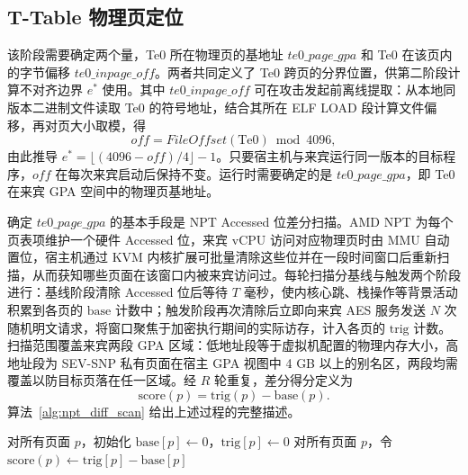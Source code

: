 \subsection{T-Table 物理页定位}
\label{sec:phase1}

该阶段需要确定两个量，Te0 所在物理页的基地址 $\mathit{te0\_page\_gpa}$ 和 Te0 在该页内的字节偏移 $\mathit{te0\_inpage\_off}$。两者共同定义了 Te0 跨页的分界位置，供第二阶段计算不对齐边界 $e^\ast$ 使用。其中 $\mathit{te0\_inpage\_off}$ 可在攻击发起前离线提取：从本地同版本二进制文件读取 Te0 的符号地址，结合其所在 ELF LOAD 段计算文件偏移，再对页大小取模，得
\begin{equation}
  \mathit{off} = \mathit{FileOffset}(\mathrm{Te0}) \bmod 4096,
  \label{eq:inpage_off}
\end{equation}
由此推导 $e^\ast = \lfloor (4096 - \mathit{off}) / 4 \rfloor - 1$。只要宿主机与来宾运行同一版本的目标程序，$\mathit{off}$ 在每次来宾启动后保持不变。运行时需要确定的是 $\mathit{te0\_page\_gpa}$，即 Te0 在来宾 GPA 空间中的物理页基地址。

确定 $\mathit{te0\_page\_gpa}$ 的基本手段是 NPT Accessed 位差分扫描。AMD NPT 为每个页表项维护一个硬件 Accessed 位，来宾 vCPU 访问对应物理页时由 MMU 自动置位，宿主机通过 KVM 内核扩展可批量清除这些位并在一段时间窗口后重新扫描，从而获知哪些页面在该窗口内被来宾访问过。每轮扫描分基线与触发两个阶段进行：基线阶段清除 Accessed 位后等待 $T$ 毫秒，使内核心跳、栈操作等背景活动积累到各页的 $\mathrm{base}$ 计数中；触发阶段再次清除后立即向来宾 AES 服务发送 $N$ 次随机明文请求，将窗口聚焦于加密执行期间的实际访存，计入各页的 $\mathrm{trig}$ 计数。扫描范围覆盖来宾两段 GPA 区域：低地址段等于虚拟机配置的物理内存大小，高地址段为 SEV-SNP 私有页面在宿主 GPA 视图中 4 GB 以上的别名区，两段均需覆盖以防目标页落在任一区域。经 $R$ 轮重复，差分得分定义为
\begin{equation}
  \mathrm{score}(p) = \mathrm{trig}(p) - \mathrm{base}(p).
  \label{eq:npt_score}
\end{equation}
算法~\ref{alg:npt_diff_scan} 给出上述过程的完整描述。

\begin{algorithm}[htbp]
  \SetAlgoLined
  \caption{NPT Accessed 位差分扫描}
  \label{alg:npt_diff_scan}
  对所有页面 $p$，初始化 $\mathrm{base}[p] \leftarrow 0$，$\mathrm{trig}[p] \leftarrow 0$\;
  \BlankLine
  对所有页面 $p$，令 $\mathrm{score}(p) \leftarrow \mathrm{trig}[p] - \mathrm{base}[p]$\;
\end{algorithm}


